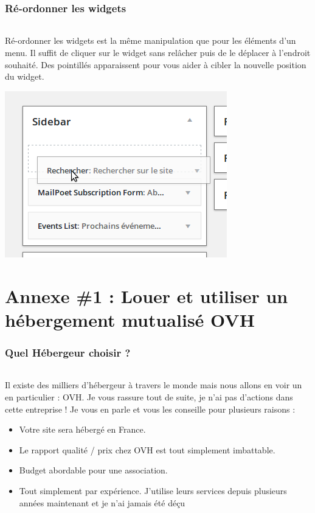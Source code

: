 \documentclass[10pt,a4paper]{article}
\begin{document}
\section{Ré-ordonner les widgets}
\paragraph{}Ré-ordonner les widgets est la même manipulation que pour les éléments d'un menu. Il suffit de cliquer sur le widget sans relâcher puis de le déplacer à l'endroit souhaité. Des pointillés apparaissent pour vous aider à cibler la nouvelle position du widget.
\begin{center}
\includegraphics[scale=0.3]{img/0259.png}
\end{center}
\newpage

\part{Annexe \#1 : Louer et utiliser un hébergement mutualisé OVH}
\newpage

\section{Quel Hébergeur choisir ?}
\paragraph{}Il existe des milliers d'hébergeur à travers le monde mais nous allons en voir un en particulier : OVH. Je vous rassure tout de suite, je n'ai pas d'actions dans cette entreprise ! Je vous en parle et vous les conseille pour plusieurs raisons :
\begin{itemize}
\item Votre site sera hébergé en France.
\item Le rapport qualité / prix chez OVH est tout simplement imbattable.
\item Budget abordable pour une association.
\item Tout simplement par expérience. J'utilise leurs services depuis plusieurs années maintenant et je n'ai jamais été déçu
\end{itemize}
\end{document}
